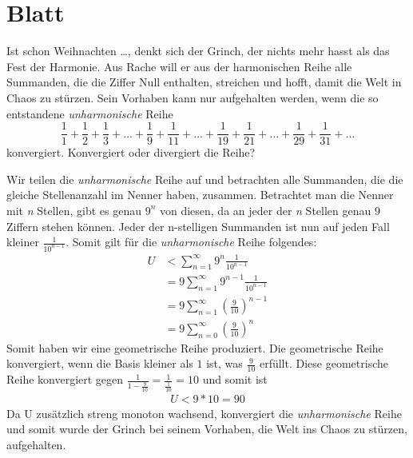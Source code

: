 \section{Blatt}

\begin{aufg}[6 Punkte]
\glqq Ist schon Weihnachten \ldots\grqq, denkt sich der Grinch, der nichts mehr hasst als das Fest der Harmonie. Aus Rache will er aus der harmonischen Reihe alle Summanden, die die Ziffer Null enthalten, streichen und hofft, damit die Welt in Chaos zu st\"urzen. Sein Vorhaben kann nur aufgehalten werden, wenn die so entstandene \emph{unharmonische} Reihe
\[
 \frac{1}{1} + \frac{1}{2} + \frac{1}{3} + \ldots + \frac{1}{9} + \frac{1}{11} + \ldots + \frac{1}{19} + \frac{1}{21} + \ldots + \frac{1}{29} + \frac{1}{31} + \ldots
\]
konvergiert. Konvergiert oder divergiert die Reihe?
\end{aufg}

\bigskip

\begin{lsg}
Wir teilen die \emph{unharmonische} Reihe auf und betrachten alle Summanden, die die gleiche Stellenanzahl im Nenner haben, zusammen.
Betrachtet man die Nenner mit \emph{n} Stellen, gibt es genau $9^{n}$ von diesen, da an jeder der \emph{n} Stellen genau $9$ Ziffern stehen können.
Jeder der n-stelligen Summanden ist nun auf jeden Fall kleiner $\frac{1}{10^{n-1}}$. Somit gilt für die \emph{unharmonische} Reihe folgendes:
\begin{align*}
U&<\sum\limits_{n=1}^\infty 9^{n}\frac{1}{10^{n-1}}\\
&=9\sum\limits_{n=1}^\infty 9^{n-1}\frac{1}{10^{n-1}}\\
&=9\sum\limits_{n=1}^\infty (\frac{9}{10})^{n-1}\\
&=9\sum\limits_{n=0}^\infty (\frac{9}{10})^{n}
 \end{align*}
Somit haben wir eine geometrische Reihe produziert. Die geometrische Reihe konvergiert, wenn die Basis kleiner als $1$ ist, was $\frac{9}{10}$ erfüllt.
Diese geometrische Reihe konvergiert gegen $\frac{1}{1-\frac{9}{10}}=\frac{1}{\frac{1}{10}}=10$ und somit ist
\begin{align*}
U<9*10=90
\end{align*}
Da U zusätzlich streng monoton wachsend, konvergiert die \emph{unharmonische} Reihe und somit wurde der Grinch bei seinem Vorhaben, die Welt ins Chaos zu st\"urzen, aufgehalten. 
\end{lsg}


\bigskip


